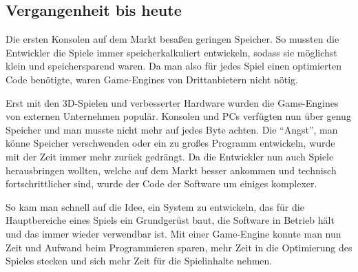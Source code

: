 \subsection{Vergangenheit bis heute}
\label{vergangenheit}
Die ersten Konsolen auf dem Markt besaßen geringen Speicher. So mussten die Entwickler die Spiele immer speicherkalkuliert entwickeln, sodass sie möglichst klein und speichersparend waren.\cite{gbdetails} Da man also für jedes Spiel einen optimierten Code benötigte, waren Game-Engines von Drittanbietern nicht nötig.

Erst mit den 3D-Spielen und verbesserter Hardware wurden die Game-Engines von externen Unternehmen populär. Konsolen und PCs verfügten nun über genug Speicher und man musste nicht mehr auf jedes Byte achten. Die "`Angst"', man könne Speicher verschwenden oder ein zu großes Programm entwickeln, wurde mit der Zeit immer mehr zurück gedrängt.
Da die Entwickler nun auch Spiele herausbringen wollten, welche auf dem Markt besser ankommen und technisch fortschrittlicher sind, wurde der Code der Software um einiges komplexer.

So kam man schnell auf die Idee, ein System zu entwickeln, das für die Hauptbereiche eines Spiels ein Grundgerüst baut, die Software in Betrieb hält und das immer wieder verwendbar ist. Mit einer Game-Engine konnte man nun Zeit und Aufwand beim Programmieren sparen, mehr Zeit in die Optimierung des Spieles stecken und sich mehr Zeit für die Spielinhalte nehmen. 

